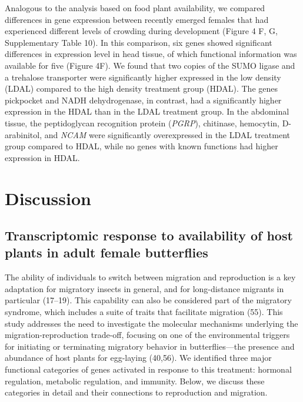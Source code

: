 \documentclass[lineno]{wiley-article}
\begin{document}
Analogous to the analysis based on food plant availability, we compared differences in gene expression between recently emerged females that had experienced different levels of crowding during development (Figure 4 F, G, Supplementary Table 10). In this comparison, six genes showed significant differences in expression level in head tissue, of which functional information was available for five (Figure 4F). We found that two copies of the SUMO ligase and a trehalose transporter were significantly higher expressed in the low density (LDAL) compared to the high density treatment group (HDAL). The genes pickpocket and NADH dehydrogenase, in contrast, had a significantly higher expression in the HDAL than in the LDAL treatment group. In the abdominal tissue, the peptidoglycan recognition protein (\textit{PGRP}), chitinase, hemocytin, D-arabinitol, and \textit{NCAM} were significantly overexpressed in the LDAL treatment group compared to HDAL, while no genes with known functions had higher expression in HDAL.

\section{Discussion}
\subsection{Transcriptomic response to availability of host plants in adult female butterflies}
The ability of individuals to switch between migration and reproduction is a key adaptation for migratory insects in general, and for long-distance migrants in particular (17–19). This capability can also be considered part of the migratory syndrome, which includes a suite of traits that facilitate migration (55). This study addresses the need to investigate the molecular mechanisms underlying the migration-reproduction trade-off, focusing on one of the environmental triggers for initiating or terminating migratory behavior in butterflies—the presence and abundance of host plants for egg-laying (40,56). We identified three major functional categories of genes activated in response to this treatment: hormonal regulation, metabolic regulation, and immunity. Below, we discuss these categories in detail and their connections to reproduction and migration.
\end{document}
